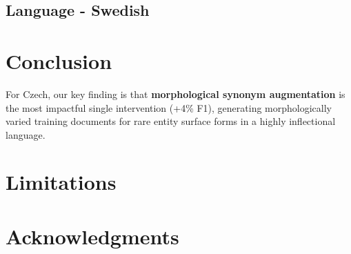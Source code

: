 \documentclass[11pt]{article}
\begin{document}
\subsection{Language - Swedish}

\section{Conclusion}

For Czech, our key finding is that \textbf{morphological synonym augmentation} is the
most impactful single intervention (+4\% F1), generating morphologically varied training
documents for rare entity surface forms in a highly inflectional language.

\section*{Limitations}

\section*{Acknowledgments}

%



\end{document}
